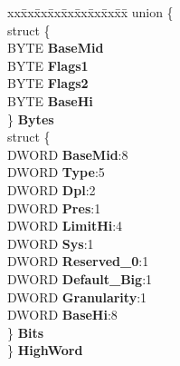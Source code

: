 \begin{DoxyCompactItemize}
\begin{tabbing}
\end{tabbing}\item 
\mbox{\label{struct___l_d_t___e_n_t_r_y_a24e649377b23a2507a80ade47b44a6e3}} 
\begin{tabbing}
xx\=xx\=xx\=xx\=xx\=xx\=xx\=xx\=xx\=\kill
union \{\\
\>struct \{\\
\>\>BYTE {\bfseries BaseMid}\\
\>\>BYTE {\bfseries Flags1}\\
\>\>BYTE {\bfseries Flags2}\\
\>\>BYTE {\bfseries BaseHi}\\
\>\} {\bfseries Bytes}\\
\>struct \{\\
\>\>DWORD {\bfseries BaseMid}:8\\
\>\>DWORD {\bfseries Type}:5\\
\>\>DWORD {\bfseries Dpl}:2\\
\>\>DWORD {\bfseries Pres}:1\\
\>\>DWORD {\bfseries LimitHi}:4\\
\>\>DWORD {\bfseries Sys}:1\\
\>\>DWORD {\bfseries Reserved\_0}:1\\
\>\>DWORD {\bfseries Default\_Big}:1\\
\>\>DWORD {\bfseries Granularity}:1\\
\>\>DWORD {\bfseries BaseHi}:8\\
\>\} {\bfseries Bits}\\
\} {\bfseries HighWord}\\


\end{tabbing}
\end{DoxyCompactItemize}
